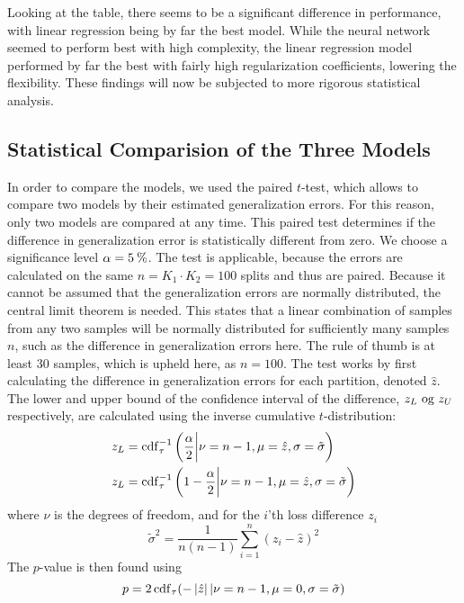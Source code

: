 Looking at the table, there seems to be a significant difference in performance, with linear regression being by far the best model.
While the neural network seemed to perform best with high complexity, the linear regression model performed by far the best with fairly high regularization coefficients, lowering the flexibility.
These findings will now be subjected to more rigorous statistical analysis.

\subsection{Statistical Comparision of the Three Models}
In order to compare the models, we used the paired $ t $-test, which allows to compare two models by their estimated generalization errors. \cite[p. 210]{bog}
For this reason, only two models are compared at any time.
This paired test determines if the difference in generalization error is statistically different from zero.
We choose a significance level $ \alpha=5\:\text{\%{}} $.
The test is applicable, because the errors are calculated on the same $ n=K_1\cdot K_2=100 $ splits and thus are paired.
Because it cannot be assumed that the generalization errors are normally distributed, the central limit theorem is needed.
This states that a linear combination of samples from any two samples will be normally distributed for sufficiently many samples $ n $, such as the difference in generalization errors here.
The rule of thumb is at least 30 samples, which is upheld here, as $ n=100 $.
The test works by first calculating the difference in generalization errors for each partition, denoted $ \hat z $.
The lower and upper bound of the confidence interval of the difference, $ z_L\textup{ og } z_U $ respectively, are calculated using the inverse cumulative $ t $-distribution:
\begin{align}
	&z_L=\operatorname{cdf}_\tau^{-1} \left(\frac\alpha 2\bigg\vert \nu=n-1, \mu=\hat z, \sigma=\tilde{\sigma}\right)\label{eq:lower}\\
	&z_L=\operatorname{cdf}_\tau^{-1} \left(1-\frac\alpha 2\bigg\vert \nu=n-1, \mu=\hat z, \sigma=\tilde{\sigma}\right)\label{eq:upper}
\end{align}
where $ \nu $ is the degrees of freedom, and for the $ i $'th loss difference $ z_i $
\begin{equation}\label{eq:sigma}
	\tilde{\sigma}^2=\frac{1}{n(n-1)}\sum\limits_{i=1}^n(z_i-\hat z)^2
\end{equation}
The $ p $-value is then found using
\begin{equation}\label{eq:p}
	p=2\operatorname{cdf}_\tau (-\left\lvert\hat z\right\rvert \vert \nu=n-1, \mu=0, \sigma=\tilde{\sigma})
\end{equation}
